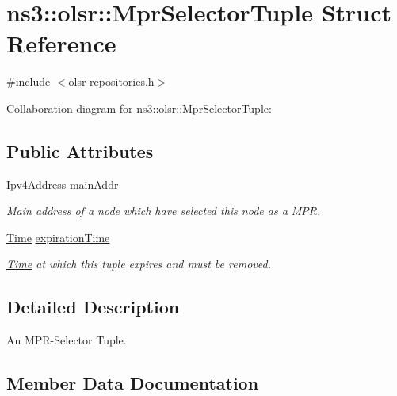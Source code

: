 \hypertarget{structns3_1_1olsr_1_1MprSelectorTuple}{}\section{ns3\+:\+:olsr\+:\+:Mpr\+Selector\+Tuple Struct Reference}
\label{structns3_1_1olsr_1_1MprSelectorTuple}


{\ttfamily \#include $<$olsr-\/repositories.\+h$>$}



Collaboration diagram for ns3\+:\+:olsr\+:\+:Mpr\+Selector\+Tuple\+:
\subsection*{Public Attributes}
\begin{DoxyCompactItemize}
\item 
\hyperlink{classns3_1_1Ipv4Address}{Ipv4\+Address} \hyperlink{structns3_1_1olsr_1_1MprSelectorTuple_a7e1e37f791d34c0e3e0e2b57ab5d1925}{main\+Addr}
\begin{DoxyCompactList}\small\item\em Main address of a node which have selected this node as a M\+PR. \end{DoxyCompactList}\item 
\hyperlink{classns3_1_1Time}{Time} \hyperlink{structns3_1_1olsr_1_1MprSelectorTuple_ace6344f90e31124d0146ba3bdef6de89}{expiration\+Time}
\begin{DoxyCompactList}\small\item\em \hyperlink{classns3_1_1Time}{Time} at which this tuple expires and must be removed. \end{DoxyCompactList}\end{DoxyCompactItemize}


\subsection{Detailed Description}
An M\+P\+R-\/\+Selector Tuple. 

\subsection{Member Data Documentation}
